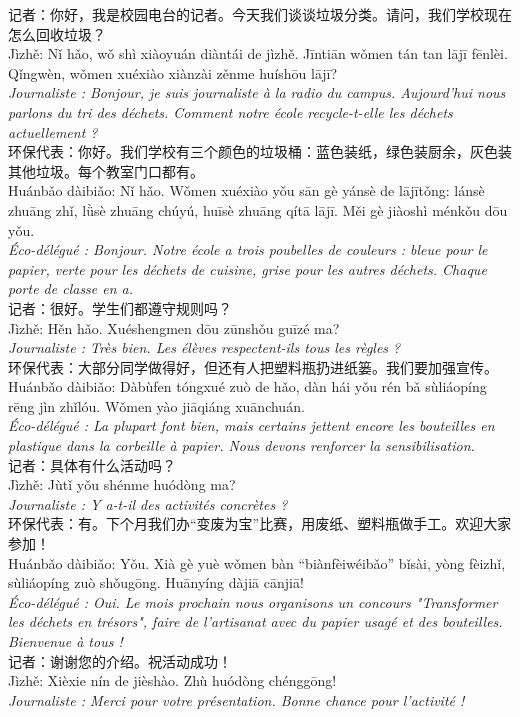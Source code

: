 \documentclass[11pt]{article}
\begin{document}
\begin{textebox}
记者：你好，我是校园电台的记者。今天我们谈谈垃圾分类。请问，我们学校现在怎么回收垃圾？\\
Jìzhě: Nǐ hǎo, wǒ shì xiàoyuán diàntái de jìzhě. Jīntiān wǒmen tán tan lājī fēnlèi. Qǐngwèn, wǒmen xuéxiào xiànzài zěnme huíshōu lājī?\\
\textit{Journaliste : Bonjour, je suis journaliste à la radio du campus. Aujourd'hui nous parlons du tri des déchets. Comment notre école recycle-t-elle les déchets actuellement ?}\\
环保代表：你好。我们学校有三个颜色的垃圾桶：蓝色装纸，绿色装厨余，灰色装其他垃圾。每个教室门口都有。\\
Huánbǎo dàibiǎo: Nǐ hǎo. Wǒmen xuéxiào yǒu sān gè yánsè de lājītǒng: lánsè zhuāng zhǐ, lǜsè zhuāng chúyú, huīsè zhuāng qítā lājī. Měi gè jiàoshì ménkǒu dōu yǒu.\\
\textit{Éco-délégué : Bonjour. Notre école a trois poubelles de couleurs : bleue pour le papier, verte pour les déchets de cuisine, grise pour les autres déchets. Chaque porte de classe en a.}\\
记者：很好。学生们都遵守规则吗？\\
Jìzhě: Hěn hǎo. Xuéshengmen dōu zūnshǒu guīzé ma?\\
\textit{Journaliste : Très bien. Les élèves respectent-ils tous les règles ?}\\
环保代表：大部分同学做得好，但还有人把塑料瓶扔进纸篓。我们要加强宣传。\\
Huánbǎo dàibiǎo: Dàbùfen tóngxué zuò de hǎo, dàn hái yǒu rén bǎ sùliáopíng rēng jìn zhǐlóu. Wǒmen yào jiāqiáng xuānchuán.\\
\textit{Éco-délégué : La plupart font bien, mais certains jettent encore les bouteilles en plastique dans la corbeille à papier. Nous devons renforcer la sensibilisation.}\\
记者：具体有什么活动吗？\\
Jìzhě: Jùtǐ yǒu shénme huódòng ma?\\
\textit{Journaliste : Y a-t-il des activités concrètes ?}\\
环保代表：有。下个月我们办“变废为宝”比赛，用废纸、塑料瓶做手工。欢迎大家参加！\\
Huánbǎo dàibiǎo: Yǒu. Xià gè yuè wǒmen bàn “biànfèiwéibǎo” bǐsài, yòng fèizhǐ, sùliáopíng zuò shǒugōng. Huānyíng dàjiā cānjiā!\\
\textit{Éco-délégué : Oui. Le mois prochain nous organisons un concours "Transformer les déchets en trésors", faire de l'artisanat avec du papier usagé et des bouteilles. Bienvenue à tous !}\\
记者：谢谢您的介绍。祝活动成功！\\
Jìzhě: Xièxie nín de jièshào. Zhù huódòng chénggōng!\\
\textit{Journaliste : Merci pour votre présentation. Bonne chance pour l'activité !}
\end{textebox}
\end{document}

